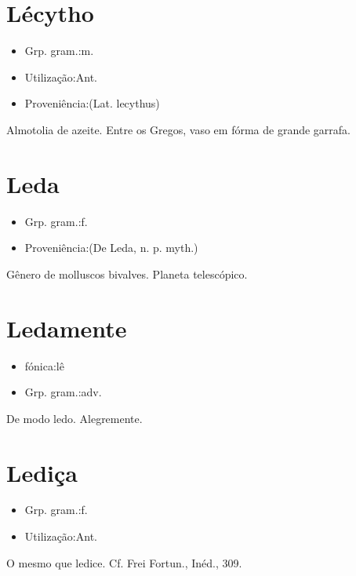\section{Lécytho}
\begin{itemize}
\item {Grp. gram.:m.}
\end{itemize}
\begin{itemize}
\item {Utilização:Ant.}
\end{itemize}
\begin{itemize}
\item {Proveniência:(Lat. \textunderscore lecythus\textunderscore )}
\end{itemize}
Almotolia de azeite.
Entre os Gregos, vaso em fórma de grande garrafa.
\section{Leda}
\begin{itemize}
\item {Grp. gram.:f.}
\end{itemize}
\begin{itemize}
\item {Proveniência:(De \textunderscore Leda\textunderscore , n. p. myth.)}
\end{itemize}
Gênero de molluscos bivalves.
Planeta telescópico.
\section{Ledamente}
\begin{itemize}
\item {fónica:lê}
\end{itemize}
\begin{itemize}
\item {Grp. gram.:adv.}
\end{itemize}
De modo ledo.
Alegremente.
\section{Lediça}
\begin{itemize}
\item {Grp. gram.:f.}
\end{itemize}
\begin{itemize}
\item {Utilização:Ant.}
\end{itemize}
O mesmo que \textunderscore ledice\textunderscore . Cf. Frei Fortun., \textunderscore Inéd.\textunderscore , 309.
